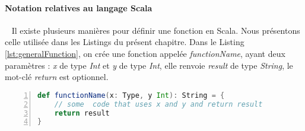 \paragraph{Notation relatives au langage Scala}~
Il existe plusieurs manières pour définir une fonction en Scala. Nous présentons celle utilisée dans les Listings du présent chapitre. Dans le Listing \ref{lst:generalFunction}, on crée une fonction appelée  \textit{functionName}, ayant deux paramètres : \textit{x} de type \textit{Int} et \textit{y} de type \textit{Int}, elle renvoie \textit{result} de type \textit{String}, le mot-clé \textit{return} est optionnel.  
\begin{lstlisting}[language=scala,firstnumber=1, caption={Exemple d'une fonction en  Scala}, label={lst:generalFunction}, basicstyle = \footnotesize,escapechar=|,numbers=left,
stepnumber=1,numberstyle=\scriptsize]
def functionName(x: Type, y Int): String = {
	// some  code that uses x and y and return result
	return result 
}
\end{lstlisting} \par

